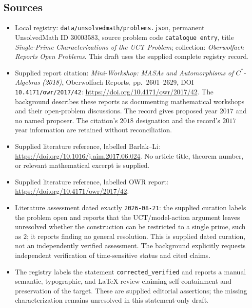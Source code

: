 \documentclass[11pt]{article}
\begin{document}
\subsection{Sources}
\begin{itemize}
\item Local registry: \texttt{data/unsolvedmath/problems.json}, permanent UnsolvedMath ID \(30003583\), source problem code \texttt{catalogue entry}, title \emph{Single-Prime Characterizations of the UCT Problem}; collection: \emph{Oberwolfach Reports Open Problems}. This draft uses the supplied complete registry record.
\item Supplied report citation: \emph{Mini-Workshop: MASAs and Automorphisms of \(C^*\)-Algebras (2018)}, Oberwolfach Reports, pp.\ 2601--2629, DOI \texttt{10.4171/owr/2017/42}: \url{https://doi.org/10.4171/owr/2017/42}. The background describes these reports as documenting mathematical workshops and their open-problem discussions. The record gives proposed year \(2017\) and no named proposer. The citation's \(2018\) designation and the record's \(2017\) year information are retained without reconciliation.
\item Supplied literature reference, labelled Barlak--Li: \url{https://doi.org/10.1016/j.aim.2017.06.024}. No article title, theorem number, or relevant mathematical excerpt is supplied.
\item Supplied literature reference, labelled OWR report: \url{https://doi.org/10.4171/owr/2017/42}.
\item Literature assessment dated exactly \texttt{2026-08-21}: the supplied curation labels the problem open and reports that the UCT/model-action argument leaves unresolved whether the construction can be restricted to a single prime, such as \(2\); it reports finding no general resolution. This is supplied dated curation, not an independently verified assessment. The background explicitly requests independent verification of time-sensitive status and cited claims.
\item The registry labels the statement \texttt{corrected\_verified} and reports a manual semantic, typographic, and LaTeX review claiming self-containment and preservation of the target. These are supplied editorial assertions; the missing characterization remains unresolved in this statement-only draft.
\end{itemize}
\end{document}
